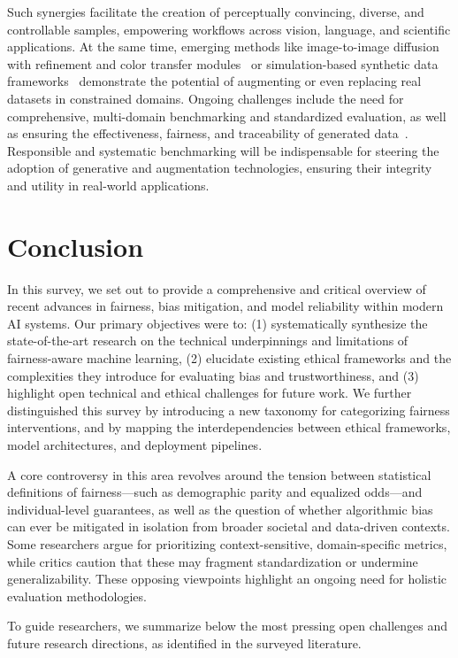 \documentclass[sigconf]{acmart}
\begin{document}
Such synergies facilitate the creation of perceptually convincing, diverse, and controllable samples, empowering workflows across vision, language, and scientific applications. At the same time, emerging methods like image-to-image diffusion with refinement and color transfer modules~\cite{ref102} or simulation-based synthetic data frameworks~\cite{ref81} demonstrate the potential of augmenting or even replacing real datasets in constrained domains. Ongoing challenges include the need for comprehensive, multi-domain benchmarking and standardized evaluation, as well as ensuring the effectiveness, fairness, and traceability of generated data~\cite{ref61,ref62,ref81,ref87,ref101,ref102}. Responsible and systematic benchmarking will be indispensable for steering the adoption of generative and augmentation technologies, ensuring their integrity and utility in real-world applications.

\section{Conclusion}

In this survey, we set out to provide a comprehensive and critical overview of recent advances in fairness, bias mitigation, and model reliability within modern AI systems. Our primary objectives were to: (1) systematically synthesize the state-of-the-art research on the technical underpinnings and limitations of fairness-aware machine learning, (2) elucidate existing ethical frameworks and the complexities they introduce for evaluating bias and trustworthiness, and (3) highlight open technical and ethical challenges for future work. We further distinguished this survey by introducing a new taxonomy for categorizing fairness interventions, and by mapping the interdependencies between ethical frameworks, model architectures, and deployment pipelines.

A core controversy in this area revolves around the tension between statistical definitions of fairness---such as demographic parity and equalized odds---and individual-level guarantees, as well as the question of whether algorithmic bias can ever be mitigated in isolation from broader societal and data-driven contexts. Some researchers argue for prioritizing context-sensitive, domain-specific metrics, while critics caution that these may fragment standardization or undermine generalizability. These opposing viewpoints highlight an ongoing need for holistic evaluation methodologies.

To guide researchers, we summarize below the most pressing open challenges and future research directions, as identified in the surveyed literature.
\end{document}
